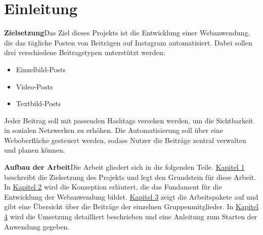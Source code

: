 \chapter{Einleitung}
\label{sec:chapter1}

\textbf{Zielsetzung}\quad Das Ziel dieses Projekts ist die Entwicklung einer Webanwendung, die das tägliche Posten von Beiträgen auf Instagram automatisiert. Dabei sollen drei verschiedene 
Beitragstypen unterstützt werden:

\begin{itemize}
    \item Einzelbild-Posts
    \item Video-Posts
    \item Textbild-Posts
\end{itemize}

Jeder Beitrag soll mit passenden Hashtags versehen werden, um die Sichtbarkeit in sozialen Netzwerken zu erhöhen. Die Automatisierung soll über eine Weboberfläche 
gesteuert werden, sodass Nutzer die Beiträge zentral verwalten und planen können.

\textbf{Aufbau der Arbeit}\quad Die Arbeit gliedert sich in die folgenden Teile. \hyperref[sec:chapter1]{Kapitel 1} beschreibt die Zielsetzung des Projekts und legt den Grundstein für diese Arbeit.
In \hyperref[sec:chapter2]{Kapitel 2} wird die Konzeption erläutert, die das Fundament für die Entwicklung der Webanwendung bildet. \hyperref[sec:chapter3]{Kapitel 3} zeigt die Arbeitspakete 
auf und gibt eine Übersicht über die Beiträge der einzelnen Gruppenmitglieder. In \hyperref[sec:chapter4]{Kapitel 4} wird die Umsetzung detailliert beschrieben und eine Anleitung zum Starten der
Anwendung gegeben.
